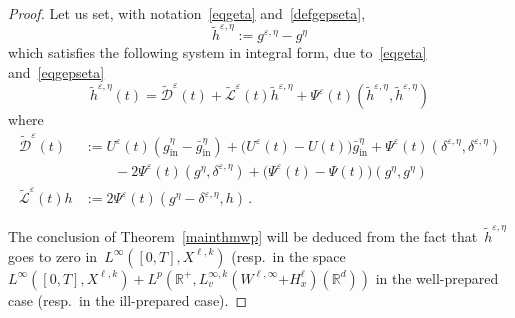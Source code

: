 \documentclass[11pt]{article}
\theoremstyle{definition}
\numberwithin{equation}{section}
\numberwithin{figure}{section}
\numberwithin{table}{section}
\newcommand*\R {\mathbb{R}}
\newcommand*\eps{{\varepsilon}}
\newcommand*\e{{\varepsilon}}
\DeclareMathOperator{\inn}{in}
\begin{document}
\begin{proof}
Let us set, with notation~\eqref{eqgeta} and~\eqref{defgepseta},
\[
\widetilde h^{\e,\eta} := g^{\eps,\eta} - g^\eta
\]
which satisfies the following system in integral form, due to~\eqref{eqgeta} and~\eqref{eqgepseta}
\begin{equation}\label{integralformtildeheps}
\widetilde h^{\e,\eta}(t) = \mathcal{\widetilde D}^{\eps}(t) + \mathcal{\widetilde L}^{\e}(t) \widetilde h^{\e,\eta}+ \Psi^\e(t) (\widetilde h^{\e,\eta},\widetilde h^{\e,\eta})
\end{equation}
where
\begin{align*}
\mathcal{\widetilde D}^{\eps}(t) & :=U^\eps (t) (g^\eta_{\inn} - \bar g^\eta_{\inn}) + \big(U^\eps (t) - U (t)\big)\bar g^\eta_{\inn} +\Psi^\eps (t) (\delta^{\eps,\eta}, \delta^{\eps,\eta})
\\&\qquad\, - 2 \Psi^\eps(t) (g^\eta, \delta^{\eps,\eta}) + \big(\Psi^\eps (t) - \Psi(t) \big) (g^\eta,g^\eta)\\
\widetilde {\mathcal{L}}^{\e}(t) h& := 2 \Psi^\e(t) (g^\eta- \delta^{\eps,\eta},h) \,.
\end{align*}

The conclusion of Theorem~\ref{mainthmwp} will be deduced from the fact that~$\widetilde h^{\e,\eta} $ goes to zero in~$L^\infty([0,T],X^{\ell,k})$ (resp.~in the space $L^\infty([0,T],X^{\ell,k})+ {L^p(\R^+,L^{\infty,k}_v(W^{\ell,\infty}{+ H^\ell_x})(\R^d))}$ in the well-prepared case (resp.~in the ill-prepared case).


\end{proof}
\end{document}
